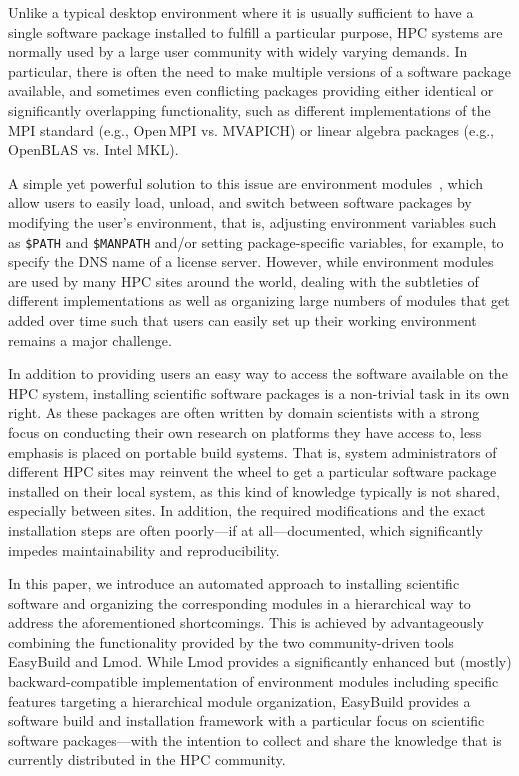 Unlike a typical desktop environment where it is usually sufficient to have a
single software package installed to fulfill a particular purpose, HPC
systems are normally used by a large user community with widely varying
demands. In particular, there is often the need to make multiple versions of
a software package available, and sometimes even conflicting packages
providing either identical or significantly overlapping functionality, such
as different implementations of the MPI standard (e.g., Open\,MPI vs.
MVAPICH) or linear algebra packages (e.g., OpenBLAS vs. Intel MKL).

A simple yet powerful solution to this issue are environment
modules~\cite{furlani91,furlani96,eadline,cmod,laytonEM1}, which allow
users to easily load, unload, and switch between software packages by
modifying the user's environment, that is, adjusting environment
variables such as \texttt{\$PATH} and \texttt{\$MANPATH} and/or setting
package-specific variables, for example, to specify the DNS name of a
license server. However, while environment modules are used by many
HPC sites around the world, dealing with the subtleties of different
implementations as well as organizing large numbers of modules that
get added over time such that users can easily set up their working environment
remains a major challenge.

In addition to providing users an easy way to access the software available
on the HPC system, installing scientific software packages is a non-trivial
task in its own right. As these packages are often written by domain
scientists with a strong focus on conducting their own research on platforms
they have access to, less emphasis is placed on portable build systems. That
is, system administrators of different HPC sites may reinvent the wheel to
get a particular software package installed on their local system, as this
kind of knowledge typically is not shared, especially between sites. In
addition, the required modifications and the exact installation steps are
often poorly---if at all---documented, which significantly impedes
maintainability and reproducibility.

In this paper, we introduce an automated approach to installing scientific
software and organizing the corresponding modules in a hierarchical way to
address the aforementioned shortcomings. This is achieved by advantageously
combining the functionality provided by the two community-driven tools
EasyBuild and Lmod. While Lmod provides a significantly enhanced but (mostly)
backward-compatible implementation of environment modules including specific
features targeting a hierarchical module organization, EasyBuild provides a
software build and installation framework with a particular focus on
scientific software packages---with the intention to collect and share the
knowledge that is currently distributed in the HPC community.

